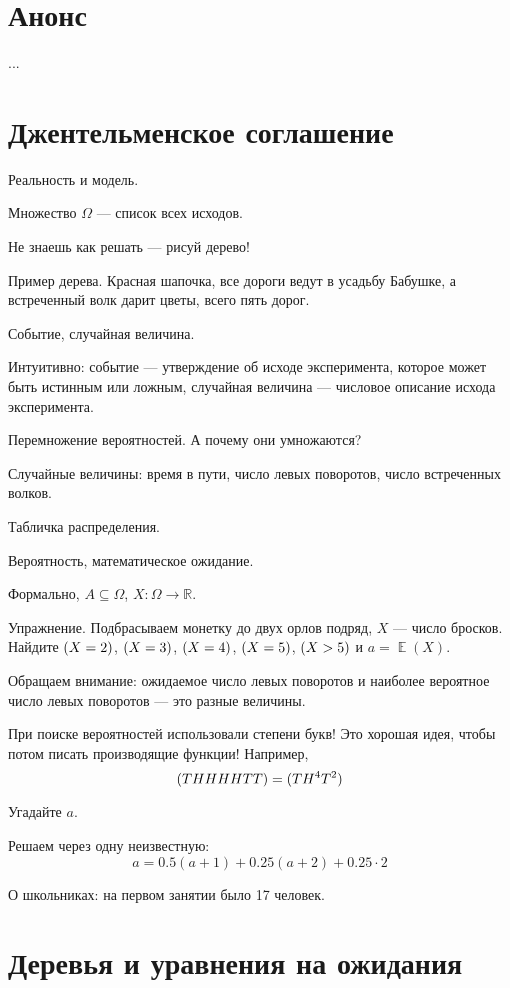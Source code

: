 \documentclass[12pt]{article}
\DeclareMathOperator{\E}{\mathbb{E}}
\let\P\relax
\DeclareMathOperator{\P}{\mathbb{P}}
\theoremstyle{definition}
\begin{document}
\tableofcontents{}

\section*{Анонс}
...

\newpage
\setcounter{section}{0}

\section{Джентельменское соглашение}

Реальность и модель. 

Множество $\Omega$ — список всех исходов. 

Не знаешь как решать — рисуй дерево!

Пример дерева. Красная шапочка, все дороги ведут в усадьбу Бабушке, а встреченный волк дарит цветы, всего пять дорог.

Событие, случайная величина. 

Интуитивно: событие — утверждение об исходе эксперимента, которое может быть истинным или ложным, случайная величина — числовое описание исхода эксперимента.

Перемножение вероятностей. А почему они умножаются?

Случайные величины: время в пути, число левых поворотов, число встреченных волков. 

Табличка распределения. 

Вероятность, математическое ожидание. 

Формально, $A \subseteq \Omega$, $X : \Omega \to \mathbb R$.

Упражнение. Подбрасываем монетку до двух орлов подряд, $X$ — число бросков. 
Найдите $\P(X=2)$, $\P(X=3)$, $\P(X=4)$, $\P(X=5)$, $\P(X>5)$ и $a=\E(X)$.

Обращаем внимание: ожидаемое число левых поворотов и наиболее вероятное число левых поворотов — это разные величины.

При поиске вероятностей использовали степени букв! Это хорошая идея, чтобы потом писать производящие функции!
Например,
\[
\P(THHHHTT) = \P(TH^4T^2)  
\]

Угадайте $a$. 

Решаем через одну неизвестную:
\[
a = 0.5(a + 1) + 0.25(a + 2) + 0.25 \cdot 2  
\]

О школьниках: на первом занятии было 17 человек. 

\section{Деревья и уравнения на ожидания}
\end{document}
